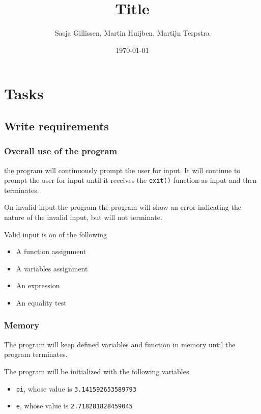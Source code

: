 \documentclass[11pt,a4paper]{article}
\author{Sasja Gillissen, Martin Huijben, Martijn Terpstra}
\date{\today}
\title{Title}
\begin{document}
\maketitle
\tableofcontents




\section{Tasks}
\label{sec:orgheadline16}
\subsection{Write requirements}
\label{sec:orgheadline8}
\subsubsection{Overall use of the program}
\label{sec:orgheadline1}
the program will continuously prompt the user for input. It will
continue to prompt the user for input until it receives the
\texttt{exit()} function as input and then terminates.

On invalid input the program the program will show an error
indicating the nature of the invalid input, but will not terminate.

Valid input is on of the following
\begin{itemize}
\item A function assignment
\item A variables assignment
\item An expression
\item An equality test
\end{itemize}
\subsubsection{Memory}
\label{sec:orgheadline2}
The program will keep defined variables and function in memory
until the program terminates.


The program will be initialized with the following variables
\begin{itemize}
\item \texttt{pi}, whose value is \texttt{3.141592653589793}
\item \texttt{e}, whose value is \texttt{2.718281828459045}
\end{itemize}
\end{document}
